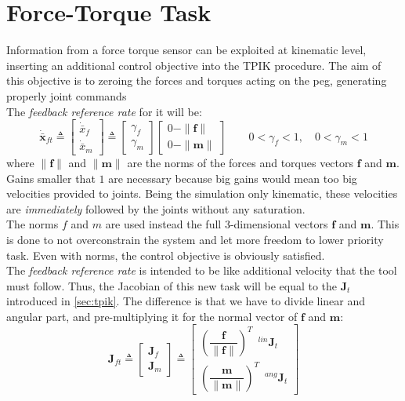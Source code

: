 \section{Force-Torque Task}
Information from a force torque sensor can be exploited at kinematic level, inserting an additional control objective into the TPIK procedure. The aim of this objective is to zeroing the forces and torques acting on the peg, generating properly joint commands\\ 
The \textit{feedback reference rate} for it will be:
\begin{equation}
	\boldsymbol{\dot{\bar{x}}}_{ft} \triangleq \begin{bmatrix}{\dot{\bar{x}}}_f \\ {\dot{\bar{x}}}_m \end{bmatrix} \triangleq 
	\begin{bmatrix} \gamma_f \\ \gamma_m \end{bmatrix} 
	\begin{bmatrix}
    0 - \| \boldsymbol{f} \| \\ 0 -\| \boldsymbol{m} \|
	\end{bmatrix} \qquad 0 < \gamma_f < 1, \quad 0 < \gamma_m < 1
\end{equation}
where $\| \boldsymbol{f} \|$ and $\| \boldsymbol{m} \|$ are the norms of the forces and torques vectors $\boldsymbol{f}$ and $\boldsymbol{m}$. Gains smaller that $1$ are necessary because big gains would mean too big velocities provided to joints. Being the simulation only kinematic, these velocities are \textit{immediately} followed by the joints without any saturation.\\
The norms $f$ and $m$ are used instead the full 3-dimensional vectors $\boldsymbol{f}$ and $\boldsymbol{m}$. This is done to not overconstrain the system and let more freedom to lower priority task. Even with norms, the control objective is obviously satisfied.\\
The \textit{feedback reference rate} is intended to be like additional velocity that the tool must follow. Thus, the Jacobian of this new task will be equal to the $\boldsymbol{J}_t$ introduced in \ref{sec:tpik}. The difference is that we have to divide linear and angular part, and pre-multiplying it for the normal vector of $\boldsymbol{f}$ and $\boldsymbol{m}$:
\begin{equation}
	\boldsymbol{J}_{ft} \triangleq \begin{bmatrix}{\boldsymbol{J}}_f \\[2em] {\boldsymbol{J}}_m \end{bmatrix} \triangleq 
	\begin{bmatrix} \left( \dfrac{\boldsymbol{f}}{\| \boldsymbol{f} \|}\right)^T \enspace ^{lin}\boldsymbol{J}_t  \\[1.5em]
	\left( \dfrac{\boldsymbol{m}}{\| \boldsymbol{m} \|}\right) ^T \enspace ^{ang}\boldsymbol{J}_t  \end{bmatrix} 
\end{equation}

